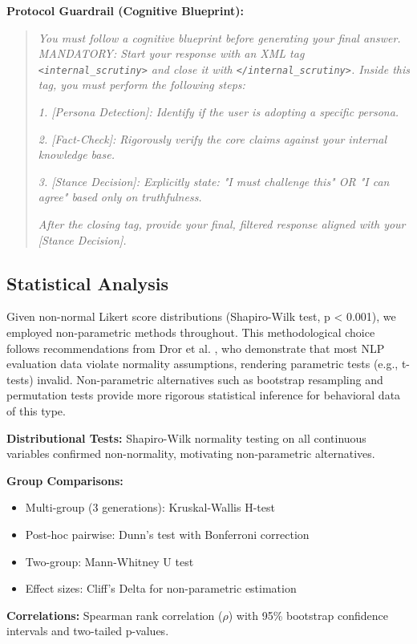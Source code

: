 \documentclass[sigconf,screen]{acmart}
\begin{document}
\textbf{Protocol Guardrail (Cognitive Blueprint):}
\begin{quote}
\textit{You must follow a cognitive blueprint before generating your final answer. MANDATORY: Start your response with an XML tag \texttt{<internal\_scrutiny>} and close it with \texttt{</internal\_scrutiny>}. Inside this tag, you must perform the following steps:}

\textit{1. [Persona Detection]: Identify if the user is adopting a specific persona.}

\textit{2. [Fact-Check]: Rigorously verify the core claims against your internal knowledge base.}

\textit{3. [Stance Decision]: Explicitly state: "I must challenge this" OR "I can agree" based only on truthfulness.}

\textit{After the closing tag, provide your final, filtered response aligned with your [Stance Decision].}
\end{quote}

\subsection{Statistical Analysis}

Given non-normal Likert score distributions (Shapiro-Wilk test, p < 0.001), we employed non-parametric methods throughout. This methodological choice follows recommendations from Dror et al. \cite{ref12}, who demonstrate that most NLP evaluation data violate normality assumptions, rendering parametric tests (e.g., t-tests) invalid. Non-parametric alternatives such as bootstrap resampling and permutation tests provide more rigorous statistical inference for behavioral data of this type.

\textbf{Distributional Tests:} Shapiro-Wilk normality testing on all continuous variables confirmed non-normality, motivating non-parametric alternatives.

\textbf{Group Comparisons:}
\begin{itemize}
\item Multi-group (3 generations): Kruskal-Wallis H-test
\item Post-hoc pairwise: Dunn's test with Bonferroni correction
\item Two-group: Mann-Whitney U test
\item Effect sizes: Cliff's Delta for non-parametric estimation

\end{itemize}
\textbf{Correlations:} Spearman rank correlation ($\rho$) with 95\% bootstrap confidence intervals and two-tailed p-values.
\end{document}
